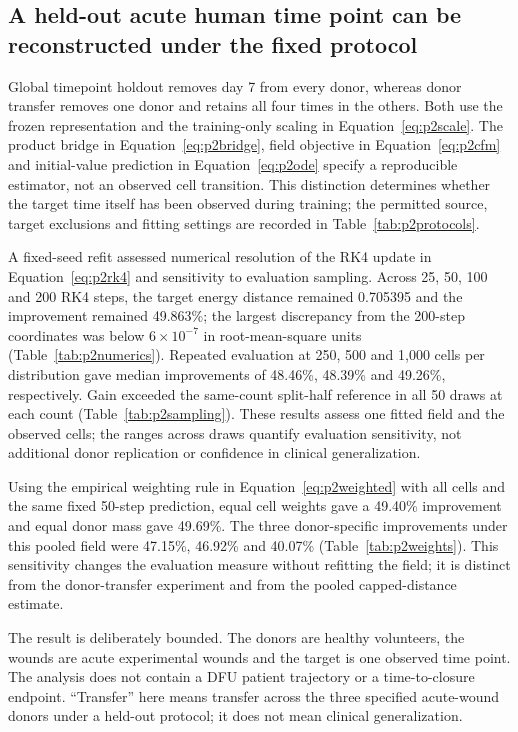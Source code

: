 \subsection{A held-out acute human time point can be reconstructed under the fixed protocol}

Global timepoint holdout removes day 7 from every donor, whereas donor transfer removes one donor and retains all four times in the others. Both use the frozen representation and the training-only scaling in Equation~\eqref{eq:p2scale}. The product bridge in Equation~\eqref{eq:p2bridge}, field objective in Equation~\eqref{eq:p2cfm} and initial-value prediction in Equation~\eqref{eq:p2ode} specify a reproducible estimator, not an observed cell transition. This distinction determines whether the target time itself has been observed during training; the permitted source, target exclusions and fitting settings are recorded in Table~\ref{tab:p2protocols}.

A fixed-seed refit assessed numerical resolution of the RK4 update in Equation~\eqref{eq:p2rk4} and sensitivity to evaluation sampling. Across 25, 50, 100 and 200 RK4 steps, the target energy distance remained 0.705395 and the improvement remained 49.863\%; the largest discrepancy from the 200-step coordinates was below $6\times10^{-7}$ in root-mean-square units (Table~\ref{tab:p2numerics}). Repeated evaluation at 250, 500 and 1,000 cells per distribution gave median improvements of 48.46\%, 48.39\% and 49.26\%, respectively. Gain exceeded the same-count split-half reference in all 50 draws at each count (Table~\ref{tab:p2sampling}). These results assess one fitted field and the observed cells; the ranges across draws quantify evaluation sensitivity, not additional donor replication or confidence in clinical generalization.

Using the empirical weighting rule in Equation~\eqref{eq:p2weighted} with all cells and the same fixed 50-step prediction, equal cell weights gave a 49.40\% improvement and equal donor mass gave 49.69\%. The three donor-specific improvements under this pooled field were 47.15\%, 46.92\% and 40.07\% (Table~\ref{tab:p2weights}). This sensitivity changes the evaluation measure without refitting the field; it is distinct from the donor-transfer experiment and from the pooled capped-distance estimate.

The result is deliberately bounded. The donors are healthy volunteers, the wounds are acute experimental wounds and the target is one observed time point. The analysis does not contain a DFU patient trajectory or a time-to-closure endpoint. ``Transfer'' here means transfer across the three specified acute-wound donors under a held-out protocol; it does not mean clinical generalization.

